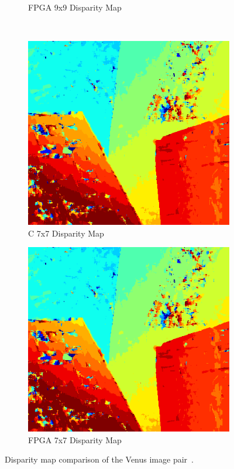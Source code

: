 \begin{figure}
\begin{center}
\begin{subfigure}{0.45\textwidth}
		\caption{FPGA 9x9 Disparity Map}
		\label{fig:venusFPGA9x9}
	\end{subfigure}
	\\
	\begin{subfigure}{0.45\textwidth}
		\includegraphics[width=\textwidth]{figures/venus_c_7x7.png}
		\caption{C 7x7 Disparity Map}
		\label{fig:venusC7x7}
	\end{subfigure}
	\begin{subfigure}{0.45\textwidth}
		\includegraphics[width=\textwidth]{figures/venus_buffer_7x7_4.png}
		\caption{FPGA 7x7 Disparity Map}
		\label{fig:venusFPGA7x7}
	\end{subfigure}
	\captionfonts
	\caption{Disparity map comparison of the Venus image pair~\cite{middlebury}.}
	\label{fig:venusDispMap}
\end{center}
\end{figure}


